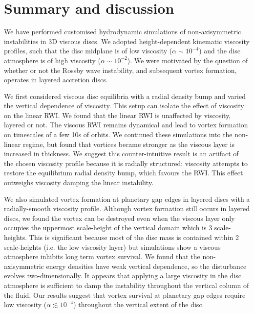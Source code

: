 \section{Summary and discussion}\label{summary}
We have performed customised hydrodynamic simulations of
non-axisymmetric instabilities in 3D viscous discs. We adopted
height-dependent kinematic viscosity profiles, such that the disc
midplane is of low viscosity ($\alpha\sim 10^{-4}$) and the disc
atmosphere is of high viscosity ($\alpha\sim 10^{-2}$). We were motivated  
by the question of whether or not the Rossby wave instability, and
subsequent vortex formation, operates in layered accretion discs.  

We first considered viscous disc equilibria with a radial density
bump and varied the vertical dependence of viscosity. 
This setup can isolate the effect of viscosity on the
linear RWI. We found that the linear RWI is unaffected by viscosity,
layered or not. The viscous RWI remains dynamical and lead to vortex
formation on timescales of a few 10s of orbits. We continued these
simulations into the non-linear regime, but found that vortices became
stronger as the viscous layer is increased in thickness. We suggest this
counter-intuitive result is an artifact of the chosen viscosity
profile because it is radially structured: viscosity attempts to
restore the equilibrium radial density bump, which favours the
RWI. This effect outweighs viscosity damping the linear instability. 

We also simulated vortex formation at planetary gap edges in layered
discs with a radially-smooth viscosity profile. %
Although vortex formation still 
occurs in layered discs, we found the vortex can be destroyed even when the viscous
layer only occupies the uppermost scale-height of the vertical domain
which is 3 scale-heights. This is significant because most of the disc
mass is contained within 2 scale-heights (i.e. the low viscosity
layer) but simulations show a viscous atmosphere inhibits long term
vortex survival.    
We found that the non-axisymmetric energy densities have
weak vertical dependence, so the disturbance evolves
two-dimensionally. It appears that applying a large viscosity in the
disc atmosphere is sufficient to damp the instability throughout the
vertical column of the fluid. Our results suggest that vortex
survival at planetary gap edges require low viscosity
($\alpha\lesssim10^{-4}$) throughout the vertical extent of the
disc. 


